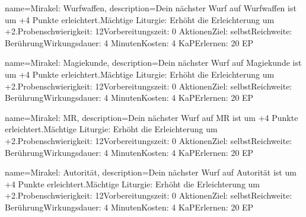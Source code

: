 {
    name={Mirakel: Wurfwaffen},
    description={Dein nächster Wurf auf Wurfwaffen ist um +4 Punkte erleichtert.\newline Mächtige Liturgie: Erhöht die Erleichterung um +2.\newline Probenschwierigkeit: 12\newline Vorbereitungszeit: 0 Aktionen\newline Ziel: selbst\newline Reichweite: Berührung\newline Wirkungsdauer: 4 Minuten\newline Kosten: 4 KaP\newline Erlernen: 20 EP}
}


{
    name={Mirakel: Magiekunde},
    description={Dein nächster Wurf auf Magiekunde ist um +4 Punkte erleichtert.\newline Mächtige Liturgie: Erhöht die Erleichterung um +2.\newline Probenschwierigkeit: 12\newline Vorbereitungszeit: 0 Aktionen\newline Ziel: selbst\newline Reichweite: Berührung\newline Wirkungsdauer: 4 Minuten\newline Kosten: 4 KaP\newline Erlernen: 20 EP}
}


{
    name={Mirakel: MR},
    description={Dein nächster Wurf auf MR ist um +4 Punkte erleichtert.\newline Mächtige Liturgie: Erhöht die Erleichterung um +2.\newline Probenschwierigkeit: 12\newline Vorbereitungszeit: 0 Aktionen\newline Ziel: selbst\newline Reichweite: Berührung\newline Wirkungsdauer: 4 Minuten\newline Kosten: 4 KaP\newline Erlernen: 20 EP}
}


{
    name={Mirakel: Autorität},
    description={Dein nächster Wurf auf Autorität ist um +4 Punkte erleichtert.\newline Mächtige Liturgie: Erhöht die Erleichterung um +2.\newline Probenschwierigkeit: 12\newline Vorbereitungszeit: 0 Aktionen\newline Ziel: selbst\newline Reichweite: Berührung\newline Wirkungsdauer: 4 Minuten\newline Kosten: 4 KaP\newline Erlernen: 20 EP}
}


